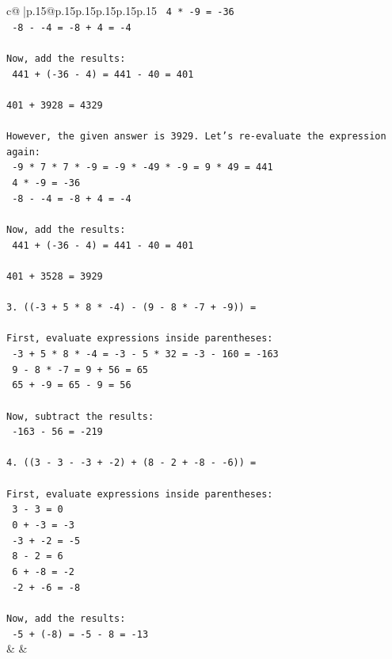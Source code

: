 \documentclass{article}
\begin{document}
{\begin{supertabular}{c@{$\;$}|p{.15\linewidth}@{}p{.15\linewidth}p{.15\linewidth}p{.15\linewidth}p{.15\linewidth}p{.15\linewidth}}
{{{\texttt{   4 * {-}9 = {-}36} \\
\texttt{   {-}8 {-} {-}4 = {-}8 + 4 = {-}4} \\
\\ 
\texttt{Now, add the results:} \\
\texttt{   441 + ({-}36 {-} 4) = 441 {-} 40 = 401} \\
\\ 
\texttt{401 + 3928 = 4329} \\
\\ 
\texttt{However, the given answer is 3929. Let's re{-}evaluate the expression again:} \\
\texttt{   {-}9 * 7 * 7 * {-}9 = {-}9 * {-}49 * {-}9 = 9 * 49 = 441} \\
\texttt{   4 * {-}9 = {-}36} \\
\texttt{   {-}8 {-} {-}4 = {-}8 + 4 = {-}4} \\
\\ 
\texttt{Now, add the results:} \\
\texttt{   441 + ({-}36 {-} 4) = 441 {-} 40 = 401} \\
\\ 
\texttt{401 + 3528 = 3929} \\
\\ 
\texttt{3. (({-}3 + 5 * 8 * {-}4) {-} (9 {-} 8 * {-}7 + {-}9)) =} \\
\\ 
\texttt{First, evaluate expressions inside parentheses:} \\
\texttt{   {-}3 + 5 * 8 * {-}4 = {-}3 {-} 5 * 32 = {-}3 {-} 160 = {-}163} \\
\texttt{   9 {-} 8 * {-}7 = 9 + 56 = 65} \\
\texttt{   65 + {-}9 = 65 {-} 9 = 56} \\
\\ 
\texttt{Now, subtract the results:} \\
\texttt{   {-}163 {-} 56 = {-}219} \\
\\ 
\texttt{4. ((3 {-} 3 {-} {-}3 + {-}2) + (8 {-} 2 + {-}8 {-} {-}6)) =} \\
\\ 
\texttt{First, evaluate expressions inside parentheses:} \\
\texttt{   3 {-} 3 = 0} \\
\texttt{   0 + {-}3 = {-}3} \\
\texttt{   {-}3 + {-}2 = {-}5} \\
\texttt{   8 {-} 2 = 6} \\
\texttt{   6 + {-}8 = {-}2} \\
\texttt{   {-}2 + {-}6 = {-}8} \\
\\ 
\texttt{Now, add the results:} \\
\texttt{   {-}5 + ({-}8) = {-}5 {-} 8 = {-}13} \\
            }
        }
    }
    & & \\ \\


\end{supertabular}}
\end{document}
